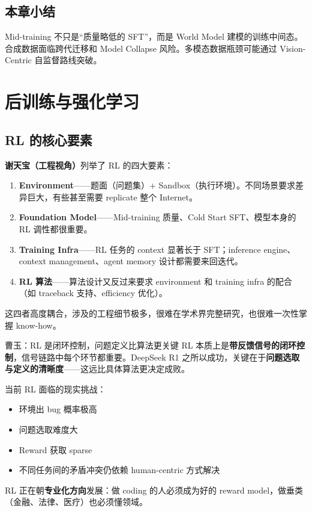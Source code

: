 \documentclass[a4paper]{article}
\begin{document}
\subsection{本章小结}
Mid-training 不只是``质量略低的 SFT''，而是 World Model 建模的训练中间态。合成数据面临跨代迁移和 Model Collapse 风险。多模态数据瓶颈可能通过 Vision-Centric 自监督路线突破。

\section{后训练与强化学习}

\subsection{RL 的核心要素}

\textbf{谢天宝（工程视角）}列举了 RL 的四大要素：
\begin{enumerate}
  \item \textbf{Environment}——题面（问题集）+ Sandbox（执行环境）。不同场景要求差异巨大，有些甚至需要 replicate 整个 Internet。
  \item \textbf{Foundation Model}——Mid-training 质量、Cold Start SFT、模型本身的 RL 调性都很重要。
  \item \textbf{Training Infra}——RL 任务的 context 显著长于 SFT；inference engine、context management、agent memory 设计都需要来回迭代。
  \item \textbf{RL 算法}——算法设计又反过来要求 environment 和 training infra 的配合（如 traceback 支持、efficiency 优化）。
\end{enumerate}
这四者高度耦合，涉及的工程细节极多，很难在学术界完整研究，也很难一次性掌握 know-how。

\begin{importantbox}{曹玉：RL 是闭环控制，问题定义比算法更关键}
RL 本质上是\textbf{带反馈信号的闭环控制}，信号链路中每个环节都重要。DeepSeek R1 之所以成功，关键在于\textbf{问题选取与定义的清晰度}——这远比具体算法更决定成败。

当前 RL 面临的现实挑战：
\begin{itemize}
  \item 环境出 bug 概率极高
  \item 问题选取难度大
  \item Reward 获取 sparse
  \item 不同任务间的矛盾冲突仍依赖 human-centric 方式解决
\end{itemize}
RL 正在朝\textbf{专业化方向}发展：做 coding 的人必须成为好的 reward model，做垂类（金融、法律、医疗）也必须懂领域。
\end{importantbox}
\end{document}
